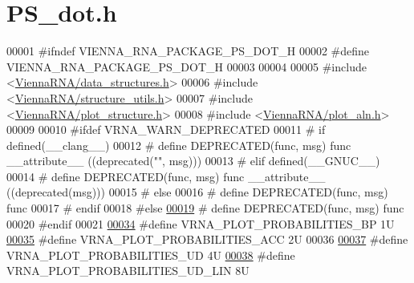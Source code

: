 \hypertarget{_p_s__dot_8h_source}{}\section{P\+S\+\_\+dot.\+h}
\label{_p_s__dot_8h_source}

\begin{DoxyCode}
00001 \textcolor{preprocessor}{#ifndef VIENNA\_RNA\_PACKAGE\_PS\_DOT\_H}
00002 \textcolor{preprocessor}{#define VIENNA\_RNA\_PACKAGE\_PS\_DOT\_H}
00003 
00004 
00005 \textcolor{preprocessor}{#include <\mbox{\hyperlink{data__structures_8h}{ViennaRNA/data\_structures.h}}>}
00006 \textcolor{preprocessor}{#include <\mbox{\hyperlink{structure__utils_8h}{ViennaRNA/structure\_utils.h}}>}
00007 \textcolor{preprocessor}{#include <\mbox{\hyperlink{plot__structure_8h}{ViennaRNA/plot\_structure.h}}>}
00008 \textcolor{preprocessor}{#include <\mbox{\hyperlink{plot__aln_8h}{ViennaRNA/plot\_aln.h}}>}
00009 
00010 \textcolor{preprocessor}{#ifdef VRNA\_WARN\_DEPRECATED}
00011 \textcolor{preprocessor}{# if defined(\_\_clang\_\_)}
00012 \textcolor{preprocessor}{#  define DEPRECATED(func, msg) func \_\_attribute\_\_ ((deprecated("", msg)))}
00013 \textcolor{preprocessor}{# elif defined(\_\_GNUC\_\_)}
00014 \textcolor{preprocessor}{#  define DEPRECATED(func, msg) func \_\_attribute\_\_ ((deprecated(msg)))}
00015 \textcolor{preprocessor}{# else}
00016 \textcolor{preprocessor}{#  define DEPRECATED(func, msg) func}
00017 \textcolor{preprocessor}{# endif}
00018 \textcolor{preprocessor}{#else}
\mbox{\hyperlink{_p_s__dot_8h_aab347a3c03fbe8e7319551b9fa0cce4a}{00019}} \textcolor{preprocessor}{# define DEPRECATED(func, msg) func}
00020 \textcolor{preprocessor}{#endif}
00021 
\mbox{\hyperlink{group__plotting__utils_gacbb7170d7e64a20671b97dafe3825011}{00034}} \textcolor{preprocessor}{#define VRNA\_PLOT\_PROBABILITIES\_BP        1U}
\mbox{\hyperlink{group__plotting__utils_ga7cf7de27166f5c445e2cf0ffc03b1a7a}{00035}} \textcolor{preprocessor}{#define VRNA\_PLOT\_PROBABILITIES\_ACC       2U}
00036 
\mbox{\hyperlink{group__plotting__utils_ga7f35d77121d2080b8c172841248b2060}{00037}} \textcolor{preprocessor}{#define VRNA\_PLOT\_PROBABILITIES\_UD        4U}
\mbox{\hyperlink{group__plotting__utils_ga6cce76e1c319a60a8b8e39d8887e2f1a}{00038}} \textcolor{preprocessor}{#define VRNA\_PLOT\_PROBABILITIES\_UD\_LIN    8U}

\end{DoxyCode}
